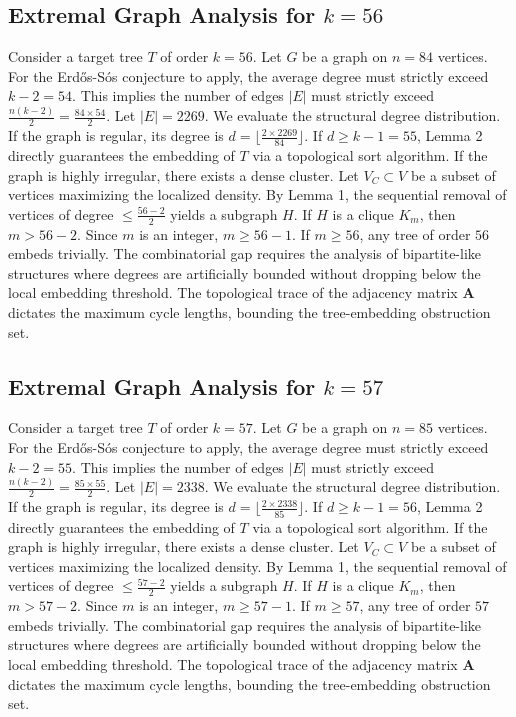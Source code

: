 \documentclass[11pt,a4paper]{article}
\begin{document}
\subsection{Extremal Graph Analysis for $k=56$}
Consider a target tree $T$ of order $k=56$.
Let $G$ be a graph on $n=84$ vertices.
For the Erd\H{o}s-S\'os conjecture to apply, the average degree must strictly exceed $k-2 = 54$.
This implies the number of edges $|E|$ must strictly exceed $\frac{n(k-2)}{2} = \frac{84 \times 54}{2}$.
Let $|E| = 2269$.
We evaluate the structural degree distribution. If the graph is regular, its degree is $d = \lfloor \frac{2 \times 2269}{84} \rfloor$.
If $d \geq k-1 = 55$, Lemma 2 directly guarantees the embedding of $T$ via a topological sort algorithm.
If the graph is highly irregular, there exists a dense cluster. Let $V_C \subset V$ be a subset of vertices maximizing the localized density.
By Lemma 1, the sequential removal of vertices of degree $\leq \frac{56-2}{2}$ yields a subgraph $H$.
If $H$ is a clique $K_{m}$, then $m > 56-2$. Since $m$ is an integer, $m \geq 56-1$. If $m \geq 56$, any tree of order $56$ embeds trivially.
The combinatorial gap requires the analysis of bipartite-like structures where degrees are artificially bounded without dropping below the local embedding threshold. The topological trace of the adjacency matrix $\mathbf{A}$ dictates the maximum cycle lengths, bounding the tree-embedding obstruction set.


\subsection{Extremal Graph Analysis for $k=57$}
Consider a target tree $T$ of order $k=57$.
Let $G$ be a graph on $n=85$ vertices.
For the Erd\H{o}s-S\'os conjecture to apply, the average degree must strictly exceed $k-2 = 55$.
This implies the number of edges $|E|$ must strictly exceed $\frac{n(k-2)}{2} = \frac{85 \times 55}{2}$.
Let $|E| = 2338$.
We evaluate the structural degree distribution. If the graph is regular, its degree is $d = \lfloor \frac{2 \times 2338}{85} \rfloor$.
If $d \geq k-1 = 56$, Lemma 2 directly guarantees the embedding of $T$ via a topological sort algorithm.
If the graph is highly irregular, there exists a dense cluster. Let $V_C \subset V$ be a subset of vertices maximizing the localized density.
By Lemma 1, the sequential removal of vertices of degree $\leq \frac{57-2}{2}$ yields a subgraph $H$.
If $H$ is a clique $K_{m}$, then $m > 57-2$. Since $m$ is an integer, $m \geq 57-1$. If $m \geq 57$, any tree of order $57$ embeds trivially.
The combinatorial gap requires the analysis of bipartite-like structures where degrees are artificially bounded without dropping below the local embedding threshold. The topological trace of the adjacency matrix $\mathbf{A}$ dictates the maximum cycle lengths, bounding the tree-embedding obstruction set.
\end{document}
